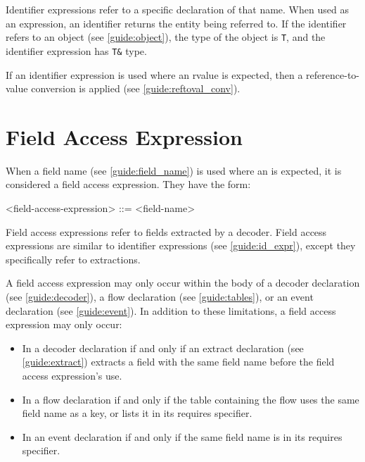 Identifier expressions refer to a specific declaration of that name. When used as an expression, an identifier returns the entity being referred to. If the identifier refers to an object (see \ref{guide:object}), the type of the object is \texttt{T}, and the identifier expression has \texttt{T\&} type. 

If an identifier expression is used where an rvalue is expected, then a reference-to-value conversion is applied (see \ref{guide:reftoval_conv}).

\section{Field Access Expression} \label{guide:field_access_expr}

When a field name (see \ref{guide:field_name}) is used where an  is expected, it is considered a field access expression. They have the form:

\begin{minip}
\begin{grammar}
<field-access-expression> ::= <field-name>
\end{grammar}
\end{minip}

Field access expressions refer to fields extracted by a decoder. Field access expressions are similar to identifier expressions (see \ref{guide:id_expr}), except they specifically refer to extractions.

A field access expression may only occur within the body of a decoder declaration (see \ref{guide:decoder}), a flow declaration (see \ref{guide:tables}), or an event declaration (see \ref{guide:event}). In addition to these limitations, a field access expression may only occur:

\begin{itemize}
\item In a decoder declaration if and only if an extract declaration (see \ref{guide:extract}) extracts a field with the same field name before the field access expression's use.

\item In a flow declaration if and only if the table containing the flow uses the same field name as a key, or lists it in its requires specifier.

\item In an event declaration if and only if the same field name is in its requires specifier.
\end{itemize}


